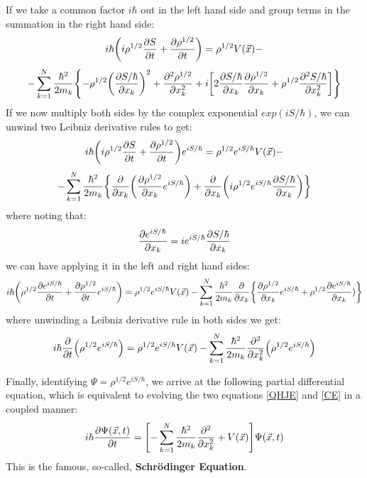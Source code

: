 \documentclass[11pt, a4paper]{article} %
\DeclareRobustCommand{\mybox}[2][gray!10]{%
\begin{tcolorbox}[   %
        left=0.2cm,
        right=0.2cm,
        top=0.15cm,
        bottom=0.15cm,
        colback=#1,
        colframe=#1,
        width=\dimexpr\textwidth\relax, 
        enlarge left by=0mm,
        boxsep=5pt,
        arc=0pt,outer arc=0pt,
        ]
        #2
\end{tcolorbox}
}
\begin{document}
\mybox{
If we take a common factor $i\hbar$ out in the left hand side and group terms in the summation in the right hand side:
\begin{equation}
i\hbar\qty(i\rho^{1/2}\pdv{S}{t} + \pdv{\rho^{1/2}}{t}) = \rho^{1/2}V(\vec{x})-
\end{equation}
$$
-\sum_{k=1}^N \frac{\hbar^2}{2m_k}\qty{-\rho^{1/2}\qty(\pdv{S/\hbar}{x_k})^2+\pdv[2]{\rho^{1/2}}{x_k}+i\qty[2\pdv{S/\hbar}{x_k}\pdv{\rho^{1/2}}{x_k}+\rho^{1/2}\pdv[2]{S/\hbar}{x_k}]}
$$
If we now multiply both sides by the complex exponential $exp(iS/\hbar)$, we can unwind two Leibniz derivative rules to get:
\begin{equation}
i\hbar\qty(i\rho^{1/2}\pdv{S}{t} + \pdv{\rho^{1/2}}{t})e^{iS/\hbar} = \rho^{1/2}e^{iS/\hbar} V(\vec{x})-
\end{equation}
$$
-\sum_{k=1}^N \frac{\hbar^2}{2m_k}\qty{\pdv{}{x_k}\qty(\pdv{\rho^{1/2}}{x_k}e^{iS/\hbar} )+\pdv{}{x_k}\qty(i\rho^{1/2}e^{iS/\hbar} \pdv{S/\hbar}{x_k})}
$$
where noting that:
\begin{equation}
\pdv{e^{iS/\hbar} }{x_k}=ie^{iS/\hbar} \pdv{S/\hbar}{x_k}
\end{equation}
we can have applying it in the left and right hand sides:
\begin{equation}
i\hbar\qty(\rho^{1/2}\pdv{e^{iS/\hbar}}{t} + \pdv{\rho^{1/2}}{t}e^{iS/\hbar}) = \rho^{1/2}e^{iS/\hbar} V(\vec{x})-\sum_{k=1}^N \frac{\hbar^2}{2m_k}\pdv{}{x_k}\qty{\pdv{\rho^{1/2}}{x_k}e^{iS/\hbar} +\rho^{1/2}\pdv{e^{iS/\hbar}}{x_k})}
\end{equation}
where unwinding a Leibniz derivative rule in both sides we get:
\begin{equation}
i\hbar\pdv{}{t}\qty(\rho^{1/2}e^{iS/\hbar}) = \rho^{1/2}e^{iS/\hbar} V(\vec{x})-\sum_{k=1}^N \frac{\hbar^2}{2m_k}\pdv[2]{}{x_k}\qty(\rho^{1/2}e^{iS/\hbar})
\end{equation}

}

Finally, identifying $\Psi=\rho^{1/2}e^{iS/\hbar}$, we arrive at the following partial differential equation, which is equivalent to evolving the two equations \eqref{QHJE} and \eqref{CE} in a coupled manner:
\begin{equation}\label{SE}
i\hbar \pdv{\Psi(\vec{x},t)}{t} = \qty[-\sum_{k=1}^N\frac{\hbar^2}{2m_k}\pdv[2]{}{x_k}+V(\vec{x})]\Psi(\vec{x},t)
\end{equation}
This is the famous, so-called, {\bf Schrödinger Equation}.
\end{document}
